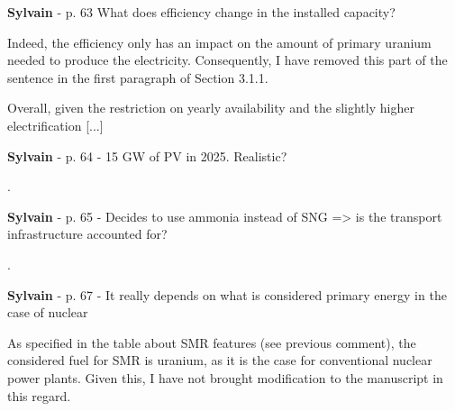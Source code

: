 \documentclass[12pt,a4paper]{article}
\begin{document}
\begin{mdframed}[style=comment] %
{\color{purple} \textbf{Sylvain}} - p. 63 What does efficiency change in the installed capacity?
\end{mdframed}

\noindent Indeed, the efficiency only has an impact on the amount of primary uranium needed to produce the electricity. Consequently, I have removed this part of the sentence {\color{blue}in the first paragraph of Section 3.1.1}. 

\begin{mdframed}[style=manuscript] %
Overall, given the restriction on yearly availability and the slightly higher electrification [...]
\end{mdframed}

\begin{mdframed}[style=comment] %
{\color{purple} \textbf{Sylvain}} - p. 64 - 15 GW of PV in 2025. Realistic?
\end{mdframed}

\noindent {\color{blue} }. 

\begin{mdframed}[style=manuscript] %

\end{mdframed}

\begin{mdframed}[style=comment] %
{\color{purple} \textbf{Sylvain}} - p. 65 - Decides to use ammonia instead of SNG => is the transport infrastructure accounted for?
\end{mdframed}

\noindent {\color{blue} }. 

\begin{mdframed}[style=manuscript] %

\end{mdframed}

\begin{mdframed}[style=comment] %
{\color{purple} \textbf{Sylvain}} - p. 67 - It really depends on what is considered primary energy in the case of nuclear
\end{mdframed}

\noindent As specified in the table about SMR features (see previous comment), the considered fuel for SMR is uranium, as it is the case for conventional nuclear power plants. Given this, I have not brought modification to the manuscript in this regard.
\end{document}
